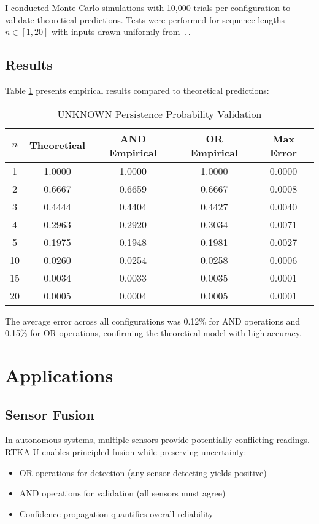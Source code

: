 \documentclass[11pt,a4paper]{article}
\begin{document}
I conducted Monte Carlo simulations with 10,000 trials per configuration to validate theoretical predictions. Tests were performed for sequence lengths $n \in [1, 20]$ with inputs drawn uniformly from $\mathbb{T}$.

\subsection{Results}

Table \ref{tab:validation} presents empirical results compared to theoretical predictions:

\begin{table}[h]
\centering
\caption{UNKNOWN Persistence Probability Validation}
\label{tab:validation}
\begin{tabular}{@{}ccccc@{}}
\toprule
$n$ & Theoretical & AND Empirical & OR Empirical & Max Error \\
\midrule
1 & 1.0000 & 1.0000 & 1.0000 & 0.0000 \\
2 & 0.6667 & 0.6659 & 0.6667 & 0.0008 \\
3 & 0.4444 & 0.4404 & 0.4427 & 0.0040 \\
4 & 0.2963 & 0.2920 & 0.3034 & 0.0071 \\
5 & 0.1975 & 0.1948 & 0.1981 & 0.0027 \\
10 & 0.0260 & 0.0254 & 0.0258 & 0.0006 \\
15 & 0.0034 & 0.0033 & 0.0035 & 0.0001 \\
20 & 0.0005 & 0.0004 & 0.0005 & 0.0001 \\
\bottomrule
\end{tabular}
\end{table}

The average error across all configurations was 0.12\% for AND operations and 0.15\% for OR operations, confirming the theoretical model with high accuracy.

\section{Applications}

\subsection{Sensor Fusion}

In autonomous systems, multiple sensors provide potentially conflicting readings. RTKA-U enables principled fusion while preserving uncertainty:

\begin{itemize}
\item OR operations for detection (any sensor detecting yields positive)
\item AND operations for validation (all sensors must agree)
\item Confidence propagation quantifies overall reliability
\end{itemize}
\end{document}
